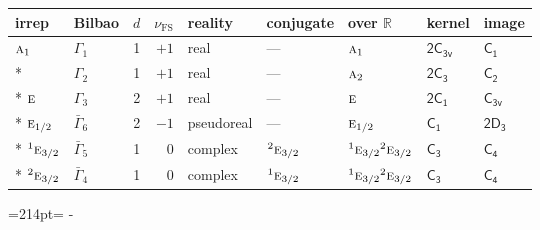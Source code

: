\documentclass[10pt,a4paper]{article}
\makeatletter
\def\grouprule#1#2{\noalign{\marks\LTgroupmarks{\the\belowrulesep}\nobreak\vskip#1%
  \vskip\aboverulesep}\multispan\LT@cols\unskip{\leaders\hrule\@height#2\hfill\kern\z@}\cr
  \noalign{\penalty\LTrulebreak\vskip\belowrulesep\global\@lastruleclass\z@}}
\newcommand{\needspace}[1]{\par\penalty-100\begingroup\dimen0=#1\relax\dimen2=\pagegoal
  \advance\dimen2-\pagetotal\ifdim\dimen0>\dimen2\relax\ifdim\dimen2>0pt\vfil\break\fi\fi
  \endgroup}
\numberwithin{equation}{section}
\newcommand{\grp}[1]{\mathsf{#1}}
\newcommand{\irr}[1]{\text{\normalfont\scshape #1}}
\newcommand{\conjpair}[1]{{}^{#1}}
\newcommand{\detbox}[1]{{\setlength{\fboxsep}{1pt}\fbox{#1}}}
\newcommand{\fsind}{\nu_{\mathrm{FS}}}
\makeatother
\begin{document}
{\small\renewcommand{\arraystretch}{1.25}\setlength{\tabcolsep}{4pt}\begin{longtable}{@{}llrrlllll@{}}\toprule
irrep & Bilbao & $d$ & $\fsind$ & reality & conjugate & over $\mathbb{R}$ & kernel & image\\\midrule\endhead
\bottomrule\endfoot\endlastfoot
$\irr{a}_{1}$ & $\Gamma_{1}$ & 1 & $+1$ & real & --- & $\irr{a}_{1}$ & \href{2C3v.pdf}{$\grp{2C_{3v}}$} & \href{../../../rotation/data/pdf/C1.pdf}{$\grp{C_{1}}$}\\*
\detbox{$\irr{a}_{2}$} & $\Gamma_{2}$ & 1 & $+1$ & real & --- & $\irr{a}_{2}$ & \href{2C3.pdf}{$\grp{2C_{3}}$} & \href{../../../rotation/data/pdf/C2.pdf}{$\grp{C_{2}}$}\\*
$\irr{e}$ & $\Gamma_{3}$ & 2 & $+1$ & real & --- & $\irr{e}$ & \href{2C1.pdf}{$\grp{2C_{1}}$} & \href{../../../rotation/data/pdf/C3v.pdf}{$\grp{C_{3v}}$}\\*
\grouprule{0pt}{\lightrulewidth}
$\irr{e}_{1/2}$ & $\bar{\Gamma}_{6}$ & 2 & $-1$ & pseudoreal & --- & $\irr{e}_{1/2}$ & \href{C1.pdf}{$\grp{C_{1}}$} & \href{2D3.pdf}{$\grp{2D_{3}}$}\\*
$\conjpair{1}\irr{e}_{3/2}$ & $\bar{\Gamma}_{5}$ & 1 & $0$ & complex & $\conjpair{2}\irr{e}_{3/2}$ & $\conjpair{1}\irr{e}_{3/2}\conjpair{2}\irr{e}_{3/2}$ & \href{C3.pdf}{$\grp{C_{3}}$} & \href{../../../rotation/data/pdf/C4.pdf}{$\grp{C_{4}}$}\\*
$\conjpair{2}\irr{e}_{3/2}$ & $\bar{\Gamma}_{4}$ & 1 & $0$ & complex & $\conjpair{1}\irr{e}_{3/2}$ & $\conjpair{1}\irr{e}_{3/2}\conjpair{2}\irr{e}_{3/2}$ & \href{C3.pdf}{$\grp{C_{3}}$} & \href{../../../rotation/data/pdf/C4.pdf}{$\grp{C_{4}}$}\\
\bottomrule\end{longtable}}
\needspace{214pt}
\end{document}
